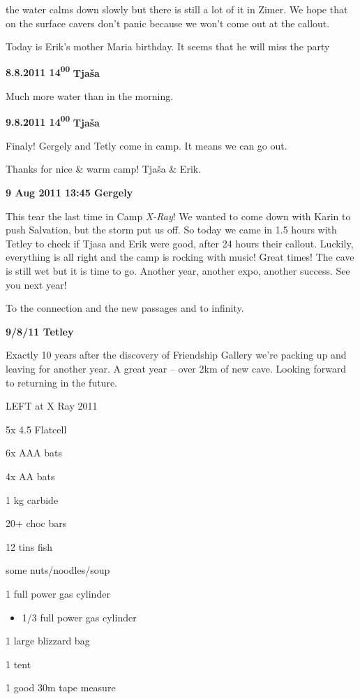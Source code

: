 the water calms down slowly but there is still a lot of it in Zimer. We
hope that on the surface cavers don't panic because we won't come out at
the callout.

Today is Erik's mother Maria birthday. It seems that he will miss the
party

\textbf{8.8.2011 14\textsuperscript{00}} \textbf{Tjaša}

Much more water than in the morning.

\textbf{9.8.2011 14\textsuperscript{00}} \textbf{Tjaša}

Finaly! Gergely and Tetly come in camp. It means we can go out.

Thanks for nice \& warm camp! Tjaša \& Erik.

\textbf{9 Aug 2011 13:45 Gergely}

This tear the last time in Camp \emph{X-Ray}! We wanted to come down
with Karin to push Salvation, but the storm put us off. So today we came
in 1.5 hours with Tetley to check if Tjasa and Erik were good, after 24
hours their callout. Luckily, everything is all right and the camp is
rocking with music! Great times! The cave is still wet but it is time to
go. Another year, another expo, another success. See you next year!

To the connection and the new passages and to infinity.

\textbf{9/8/11 Tetley}

Exactly 10 years after the discovery of Friendship Gallery we're packing
up and leaving for another year. A great year -- over 2km of new cave.
Looking forward to returning in the future.

LEFT at X Ray 2011

5x 4.5 Flatcell

6x AAA bats

4x AA bats

1 kg carbide

20+ choc bars

12 tins fish

some nuts/noodles/soup

1 full power gas cylinder

\begin{itemize}
\tightlist
\item
  1/3 full power gas cylinder
\end{itemize}

1 large blizzard bag

1 tent

1 good 30m tape measure

